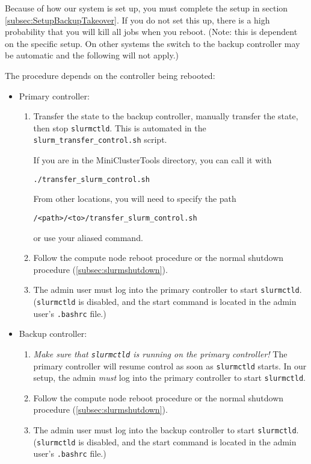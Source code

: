 Because of how our system is set up, you must complete the setup in section \ref{subsec:SetupBackupTakeover}. If you do not set this up, there is a high probability that you will kill all jobs when you reboot. (Note: this is dependent on the specific setup. On other systems the switch to the backup controller may be automatic and the following will not apply.)

The procedure depends on the controller being rebooted:

\begin{itemize}
  \item Primary controller:

    \begin{enumerate}
      \item Transfer the state to the backup controller, manually transfer the state, then stop \texttt{slurmctld}. This is automated in the \texttt{slurm\_transfer\_control.sh} script.

        If you are in the MiniClusterTools directory, you can call it with 

          \texttt{./transfer\_slurm\_control.sh}

        From other locations, you will need to specify the path

          \texttt{/<path>/<to>/transfer\_slurm\_control.sh}

        or use your aliased command.

      \item Follow the compute node reboot procedure or the normal shutdown procedure (\ref{subsec:slurmshutdown}).

      \item The admin user must log into the primary controller to start \texttt{slurmctld}. (\texttt{slurmctld} is disabled, and the start command is located in the admin user's \texttt{.bashrc} file.)

    \end{enumerate}

  \item Backup controller: 
  
    \begin{enumerate}
      \item \emph{Make sure that \emph{\texttt{slurmctld}} is running on the primary controller!} The primary controller will resume control as soon as \texttt{slurmctld} starts. In our setup, the admin \emph{must} log into the primary controller to start \texttt{slurmctld}. 

      \item Follow the compute node reboot procedure or the normal shutdown procedure (\ref{subsec:slurmshutdown}).

      \item The admin user must log into the backup controller to start \texttt{slurmctld}. (\texttt{slurmctld} is disabled, and the start command is located in the admin user's \texttt{.bashrc} file.)
    \end{enumerate}

\end{itemize}

